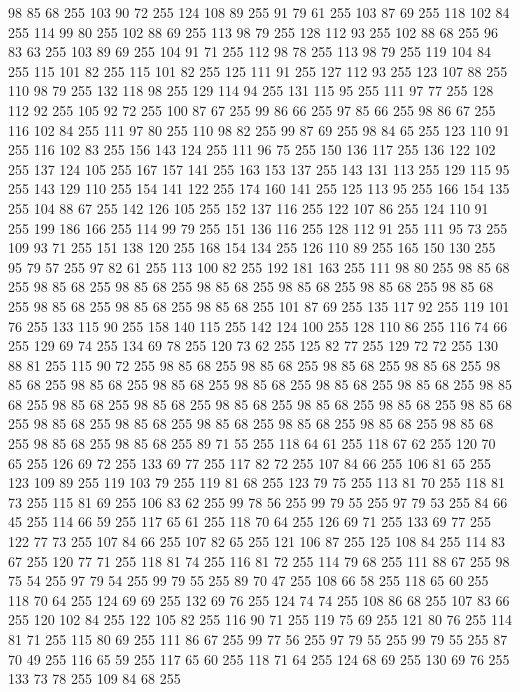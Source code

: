 98 85 68 255 103 90 72 255 124 108 89 255 91 79 61 255 103 87 69 255 118 102 84 255 114 99 80 255 102 88 69 255 113 98 79 255 128 112 93 255 102 88 68 255 96 83 63 255 103 89 69 255 104 91 71 255 112 98 78 255 113 98 79 255 119 104 84 255 115 101 82 255 115 101 82 255 125 111 91 255 127 112 93 255 123 107 88 255 110 98 79 255 132 118 98 255 129 114 94 255 131 115 95 255 111 97 77 255 128 112 92 255 105 92 72 255 100 87 67 255 99 86 66 255 97 85 66 255 98 86 67 255 116 102 84 255 111 97 80 255 110 98 82 255 99 87 69 255 98 84 65 255 123 110 91 255 116 102 83 255 156 143 124 255 111 96 75 255 150 136 117 255 136 122 102 255 137 124 105 255 167 157 141 255 163 153 137 255 143 131 113 255 129 115 95 255 143 129 110 255 154 141 122 255 174 160 141 255 125 113 95 255 166 154 135 255 104 88 67 255 142 126 105 255 152 137 116 255 122 107 86 255 124 110 91 255 199 186 166 255 114 99 79 255 151 136 116 255 128 112 91 255 111 95 73 255
109 93 71 255 151 138 120 255 168 154 134 255 126 110 89 255 165 150 130 255 95 79 57 255 97 82 61 255 113 100 82 255 192 181 163 255 111 98 80 255 98 85 68 255 98 85 68 255 98 85 68 255 98 85 68 255 98 85 68 255 98 85 68 255 98 85 68 255 98 85 68 255 98 85 68 255 98 85 68 255 101 87 69 255 135 117 92 255 119 101 76 255 133 115 90 255 158 140 115 255 142 124 100 255 128 110 86 255 116 74 66 255 129 69 74 255 134 69 78 255 120 73 62 255 125 82 77 255 129 72 72 255 130 88 81 255 115 90 72 255 98 85 68 255 98 85 68 255 98 85 68 255 98 85 68 255 98 85 68 255 98 85 68 255 98 85 68 255 98 85 68 255 98 85 68 255 98 85 68 255 98 85 68 255 98 85 68 255 98 85 68 255 98 85 68 255 98 85 68 255 98 85 68 255 98 85 68 255 98 85 68 255 98 85 68 255 98 85 68 255 98 85 68 255 98 85 68 255 98 85 68 255 98 85 68 255 98 85 68 255 89 71 55 255 118 64 61 255 118 67 62 255 120 70 65 255
126 69 72 255 133 69 77 255 117 82 72 255 107 84 66 255 106 81 65 255 123 109 89 255 119 103 79 255 119 81 68 255 123 79 75 255 113 81 70 255 118 81 73 255 115 81 69 255 106 83 62 255 99 78 56 255 99 79 55 255 97 79 53 255 84 66 45 255 114 66 59 255 117 65 61 255 118 70 64 255 126 69 71 255 133 69 77 255 122 77 73 255 107 84 66 255 107 82 65 255 121 106 87 255 125 108 84 255 114 83 67 255 120 77 71 255 118 81 74 255 116 81 72 255 114 79 68 255 111 88 67 255 98 75 54 255 97 79 54 255 99 79 55 255 89 70 47 255 108 66 58 255 118 65 60 255 118 70 64 255 124 69 69 255 132 69 76 255 124 74 74 255 108 86 68 255 107 83 66 255 120 102 84 255 122 105 82 255 116 90 71 255 119 75 69 255 121 80 76 255 114 81 71 255 115 80 69 255 111 86 67 255 99 77 56 255 97 79 55 255 99 79 55 255 87 70 49 255 116 65 59 255 117 65 60 255 118 71 64 255 124 68 69 255 130 69 76 255 133 73 78 255 109 84 68 255
